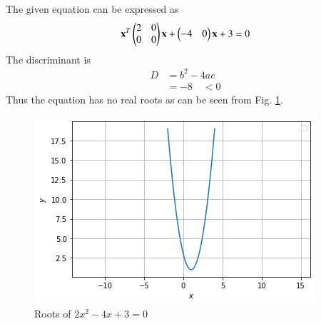 
The given equation can be expressed as 
\begin{align}
\mathbf{x}^T \begin{pmatrix}2 & 0\\0 & 0\end{pmatrix}\mathbf{x}+ \begin{pmatrix}-4 & 0\end{pmatrix}\mathbf{x}+3=0
\end{align}
%
The discriminant is 
\begin{align}
D &= b^2 - 4ac
\\
&=-8 \quad < 0
\end{align}
Thus  the equation has no real roots as can be seen from Fig. \ref{quadform/24/Roots of $2x^2 -4x + 3 = 0$}.
%
\begin{figure}[!ht]
\centering
\includegraphics[width=\columnwidth]{solutions/su2021/2/24/diagram.png}
\caption{Roots of $2x^2 -4x + 3 = 0$ }
\label{quadform/24/Roots of $2x^2 -4x + 3 = 0$}
\end{figure}



